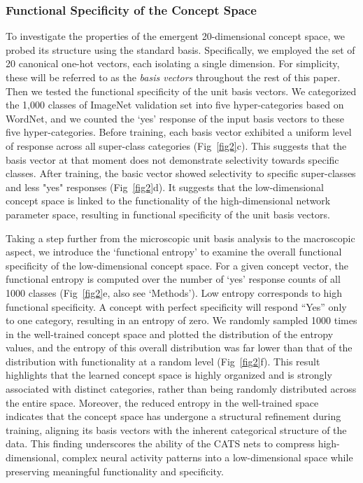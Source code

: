 \documentclass[pdflatex,sn-mathphys-num,lineno]{sn-jnl}%
\begin{document}
\begin{CJK}{UTF8}{gbsn}
\subsubsection{Functional Specificity of the Concept Space}
To investigate the properties of the emergent 20-dimensional concept space, we probed its structure using the standard basis. Specifically, we employed the set of 20 canonical one-hot vectors, each isolating a single dimension. For simplicity, these will be referred to as the \textit{basis vectors} throughout the rest of this paper. Then we tested the functional specificity of the unit basis vectors. We categorized the 1,000 classes of ImageNet validation set into five hyper-categories based on WordNet, and we counted the ‘yes’ response of the input basis vectors to these five hyper-categories. Before training, each basis vector exhibited a uniform level of response across all super-class categories (Fig~\ref{fig2}c). This suggests that the basis vector at that moment does not demonstrate selectivity towards specific classes. After training, the basic vector showed selectivity to specific super-classes and less "yes" responses (Fig~\ref{fig2}d). It suggests that the low-dimensional concept space is linked to the functionality of the high-dimensional network parameter space, resulting in functional specificity of the unit basis vectors. 

Taking a step further from the microscopic unit basis analysis to the macroscopic aspect, we introduce the ‘functional entropy’ to examine the overall functional specificity of the low-dimensional concept space. For a given concept vector, the functional entropy is computed over the number of ‘yes’ response counts of all 1000 classes (Fig~\ref{fig2}e, also see ‘Methods’). Low entropy corresponds to high functional specificity. A concept with perfect specificity will respond “Yes” only to one category, resulting in an entropy of zero. We randomly sampled 1000 times in the well-trained concept space and plotted the distribution of the entropy values, and the entropy of this overall distribution was far lower than that of the distribution with functionality at a random level (Fig~\ref{fig2}f). This result highlights that the learned concept space is highly organized and is strongly associated with distinct categories, rather than being randomly distributed across the entire space. Moreover, the reduced entropy in the well-trained space indicates that the concept space has undergone a structural refinement during training, aligning its basis vectors with the inherent categorical structure of the data. This finding underscores the ability of the CATS nets to compress high-dimensional, complex neural activity patterns into a low-dimensional space while preserving meaningful functionality and specificity.


\end{CJK}
\end{document}
